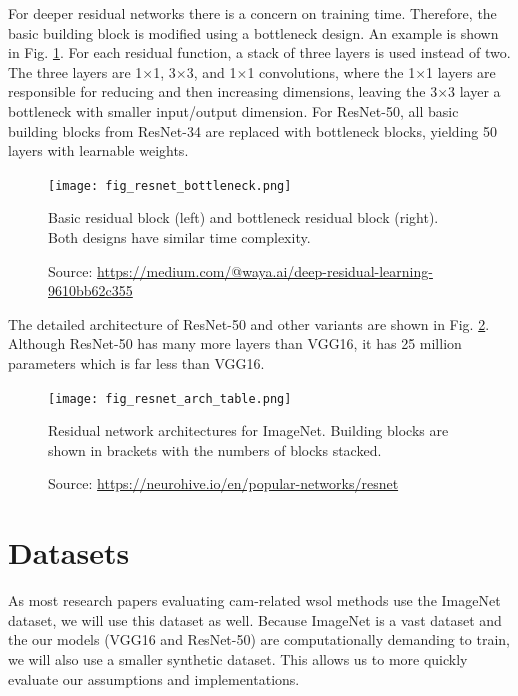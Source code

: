 For deeper residual networks there is a concern on training time. Therefore, the basic building block is modified using a bottleneck design. An example is shown in Fig. \ref{fig:resnet_bottleneck}. For each residual function, a stack of three layers is used instead of two. The three layers are 1$\times$1, 3$\times$3, and 1$\times$1 convolutions, where the 1$\times$1 layers are responsible for reducing and then increasing dimensions, leaving the 3$\times$3 layer a bottleneck with smaller input/output dimension. For ResNet-50, all basic building blocks from ResNet-34 are replaced with bottleneck blocks, yielding 50 layers with learnable weights.
\begin{figure}[ht]
    \begin{center}       
    \texttt{[image: fig\_resnet\_bottleneck.png]}
    \caption[Residual basic and bottleneck blocks]{Basic residual block (left) and bottleneck residual block (right). Both designs have similar time complexity.}
    \caption*{Source: \href{https://medium.com/@waya.ai/deep-residual-learning-9610bb62c355}{https://medium.com/@waya.ai/deep-residual-learning-9610bb62c355}}
    \label{fig:resnet_bottleneck}
    \end{center}
\end{figure}

The detailed architecture of ResNet-50 and other variants are shown in Fig. \ref{fig:resnet_arch_table}. Although ResNet-50 has many more layers than VGG16, it has 25 million parameters which is far less than VGG16. 
\begin{figure}[ht]
    \begin{center}       
    \texttt{[image: fig\_resnet\_arch\_table.png]}
    \caption[Residual network architectures]{Residual network architectures for ImageNet. Building blocks are shown in brackets with the numbers of blocks stacked.}
    \caption*{Source: \href{https://neurohive.io/en/popular-networks/resnet}{https://neurohive.io/en/popular-networks/resnet}}
    \label{fig:resnet_arch_table}
    \end{center}
\end{figure}

\section{Datasets}
As most research papers evaluating \acrshort{cam}-related \acrshort{wsol} methods use the ImageNet dataset, we will use this dataset as well. Because ImageNet is a vast dataset and the our models (VGG16 and ResNet-50) are computationally demanding to train, we will also use a smaller synthetic dataset. This allows us to more quickly evaluate our assumptions and implementations.

